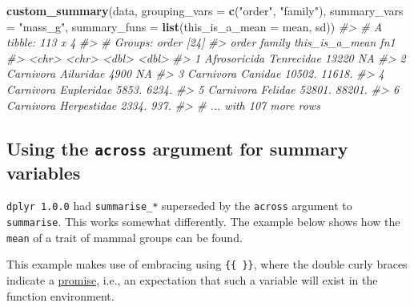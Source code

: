 \documentclass[]{book}
\newenvironment{Shaded}{}{}
\newcommand{\CommentTok}[1]{\textcolor[rgb]{0.38,0.63,0.69}{\textit{#1}}}
\newcommand{\DataTypeTok}[1]{\textcolor[rgb]{0.56,0.13,0.00}{#1}}
\newcommand{\KeywordTok}[1]{\textcolor[rgb]{0.00,0.44,0.13}{\textbf{#1}}}
\newcommand{\NormalTok}[1]{#1}
\newcommand{\StringTok}[1]{\textcolor[rgb]{0.25,0.44,0.63}{#1}}
\begin{document}
\begin{Shaded}
\begin{Highlighting}[]
\KeywordTok{custom_summary}\NormalTok{(data,}
               \DataTypeTok{grouping_vars =} \KeywordTok{c}\NormalTok{(}\StringTok{"order"}\NormalTok{, }\StringTok{"family"}\NormalTok{),}
               \DataTypeTok{summary_vars =} \StringTok{"mass_g"}\NormalTok{,}
               \DataTypeTok{summary_funs =} \KeywordTok{list}\NormalTok{(}\DataTypeTok{this_is_a_mean =}\NormalTok{ mean, sd))}
\CommentTok{#> # A tibble: 113 x 4}
\CommentTok{#> # Groups:   order [24]}
\CommentTok{#>   order        family      this_is_a_mean    fn1}
\CommentTok{#>   <chr>        <chr>                <dbl>  <dbl>}
\CommentTok{#> 1 Afrosoricida Tenrecidae          13220     NA }
\CommentTok{#> 2 Carnivora    Ailuridae            4900     NA }
\CommentTok{#> 3 Carnivora    Canidae             10502. 11618.}
\CommentTok{#> 4 Carnivora    Eupleridae           5853.  6234.}
\CommentTok{#> 5 Carnivora    Felidae             52801. 88201.}
\CommentTok{#> 6 Carnivora    Herpestidae          2334.   937.}
\CommentTok{#> # ... with 107 more rows}
\end{Highlighting}
\end{Shaded}

\hypertarget{using-the-across-argument-for-summary-variables}{%
\subsection{\texorpdfstring{Using the \texttt{across} argument for summary variables}{Using the across argument for summary variables}}\label{using-the-across-argument-for-summary-variables}}

\texttt{dplyr\ 1.0.0} had \texttt{summarise\_*} superseded by the \texttt{across} argument to \texttt{summarise}. This works somewhat differently.
The example below shows how the \texttt{mean} of a trait of mammal groups can be found.

This example makes use of embracing using \texttt{\{\{\ \}\}}, where the double curly braces indicate a \href{https://adv-r.hadley.nz/functions.html\#lazy-evaluation}{promise}, i.e., an expectation that such a variable will exist in the function environment.
\end{document}
